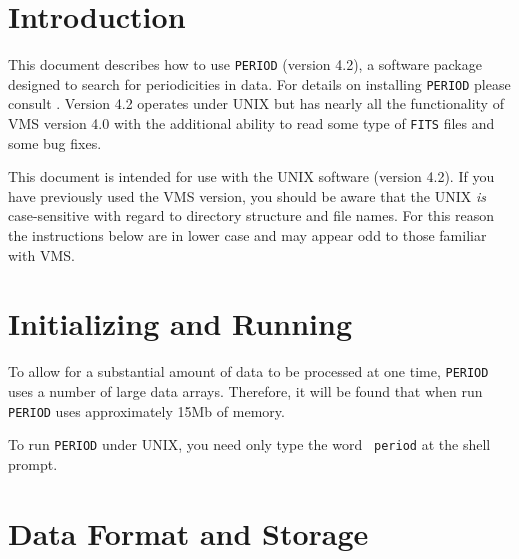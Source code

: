  \begin{latexonly}
   \setlength{\parskip}{0mm}
   \latexonlytoc
   \setlength{\parskip}{\medskipamount}
   \markboth{\stardocname}{\stardocname}
 \end{latexonly}
\newpage
\renewcommand{\thepage}{\arabic{page}}

\section{Introduction}
  
This document describes how to use {\tt PERIOD} (version 4.2), a
software package designed to search for periodicities in data.  For
details on installing {\tt PERIOD} please consult
.  Version 4.2 operates under UNIX but has nearly all
the functionality of VMS version 4.0 with the additional ability to
read some type of {\tt FITS} files and some bug fixes.

This document is intended for use with the UNIX software (version
4.2). If you have previously used the VMS version, you should be aware
that the UNIX {\em is} case-sensitive with regard to directory
structure and file names.  For this reason the instructions below are
in lower case and may appear odd to those familiar with VMS.

\section{Initializing and Running}
 
To allow for a substantial amount of data to be processed at one time,
{\tt PERIOD} uses a number of large data arrays. Therefore, it will be
found that when run {\tt PERIOD} uses approximately 15Mb of memory.
 
To run {\tt PERIOD} under UNIX, you need only type the word {\tt
period} at the shell prompt.

\section{Data Format and Storage}
\label{slots}
 
